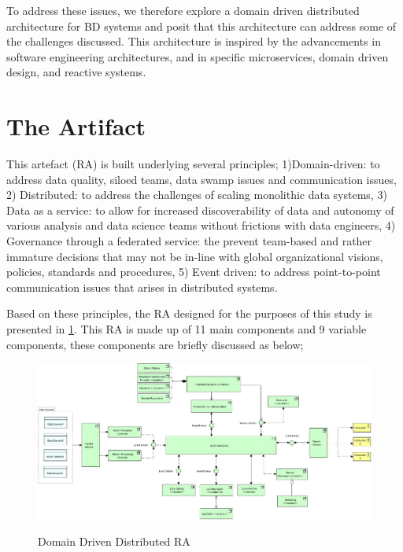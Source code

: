 \documentclass[runningheads]{llncs}
\begin{document}
To address these issues, we therefore explore a domain driven distributed architecture for BD systems and posit that this architecture can address some of the challenges discussed. This architecture is inspired by the advancements in software engineering architectures, and in specific microservices, domain driven design, and reactive systems. 

\section*{The Artifact}

This artefact (RA) is built underlying several principles; 1)Domain-driven: to address data quality, siloed teams, data swamp issues and communication issues, 2) Distributed: to address the challenges of scaling monolithic data systems, 3) Data as a service: to allow for increased discoverability of data and autonomy of various analysis and data science teams without frictions with data engineers, 4) Governance through a federated service: the prevent team-based and rather immature decisions that may not be in-line with global organizational visions, policies, standards and procedures, 5) Event driven: to address point-to-point communication issues that arises in distributed systems.

Based on these principles, the RA designed for the purposes of this study is presented in \ref{RA}. This RA is made up of 11 main components and 9 variable components, these components are briefly discussed as below; 

\begin{figure}[h!]
    \centering
    \includegraphics[width=12cm]{media/Metamycelium.jpg}
    \label{RA}
    \caption{Domain Driven Distributed RA}
\end{figure}
\end{document}
